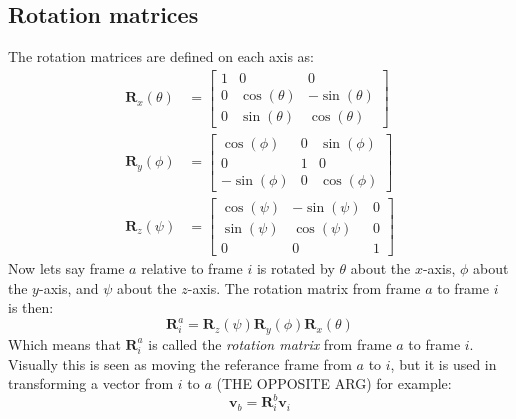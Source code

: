 \subsection{Rotation matrices}
The rotation matrices are defined on each axis as:
\begin{subequations}
    \begin{align}
    \mathbf{R}_x(\theta) &= \begin{bmatrix} 1 & 0 & 0 \\ 0 & \cos(\theta) & -\sin(\theta) \\ 0 & \sin(\theta) & \cos(\theta) \end{bmatrix} \\
    \mathbf{R}_y(\phi) &= \begin{bmatrix} \cos(\phi) & 0 & \sin(\phi) \\ 0 & 1 & 0 \\ -\sin(\phi) & 0 & \cos(\phi) \end{bmatrix} \\
    \mathbf{R}_z(\psi) &= \begin{bmatrix} \cos(\psi) & -\sin(\psi) & 0 \\ \sin(\psi) & \cos(\psi) & 0 \\ 0 & 0 & 1 \end{bmatrix}
    \end{align}
\end{subequations}
Now lets say frame $a$ relative to frame $i$ is rotated by $\theta$ about the $x$-axis, $\phi$ about the $y$-axis, and $\psi$ about the $z$-axis. The rotation matrix from frame $a$ to frame $i$ is then:
\begin{equation}
    \mathbf{R}_i^a = \mathbf{R}_z(\psi)\mathbf{R}_y(\phi)\mathbf{R}_x(\theta)
\end{equation}
Which means that $\mathbf{R}_i^a$ is called the \textit{rotation matrix} from frame $a$ to frame $i$. Visually this is seen as moving the referance frame from $a$ to $i$, but it is used in transforming a vector from $i$ to $a$ (THE OPPOSITE ARG) for example: 
\begin{equation}
    \mathbf{v}_b = \mathbf{R}_i^b\mathbf{v}_i
\end{equation}
